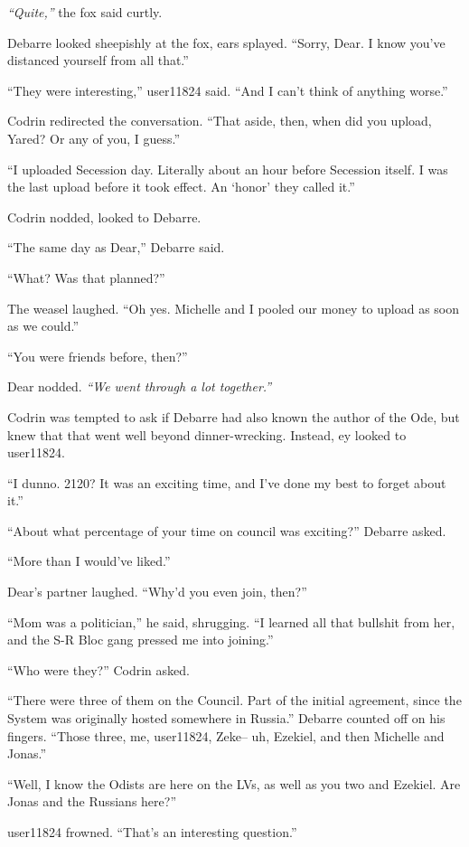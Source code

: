 \emph{``Quite,''} the fox said curtly.

Debarre looked sheepishly at the fox, ears splayed. ``Sorry, Dear. I know you've distanced yourself from all that.''

``They were interesting,'' user11824 said. ``And I can't think of anything worse.''

Codrin redirected the conversation. ``That aside, then, when did you upload, Yared? Or any of you, I guess.''

``I uploaded Secession day. Literally about an hour before Secession itself. I was the last upload before it took effect. An `honor' they called it.''

Codrin nodded, looked to Debarre.

``The same day as Dear,'' Debarre said.

``What? Was that planned?''

The weasel laughed. ``Oh yes. Michelle and I pooled our money to upload as soon as we could.''

``You were friends before, then?''

Dear nodded. \emph{``We went through a lot together.''}

Codrin was tempted to ask if Debarre had also known the author of the Ode, but knew that that went well beyond dinner-wrecking. Instead, ey looked to user11824.

``I dunno. 2120? It was an exciting time, and I've done my best to forget about it.''

``About what percentage of your time on council was exciting?'' Debarre asked.

``More than I would've liked.''

Dear's partner laughed. ``Why'd you even join, then?''

``Mom was a politician,'' he said, shrugging. ``I learned all that bullshit from her, and the S-R Bloc gang pressed me into joining.''

``Who were they?'' Codrin asked.

``There were three of them on the Council. Part of the initial agreement, since the System was originally hosted somewhere in Russia.'' Debarre counted off on his fingers. ``Those three, me, user11824, Zeke-- uh, Ezekiel, and then Michelle and Jonas.''

``Well, I know the Odists are here on the LVs, as well as you two and Ezekiel. Are Jonas and the Russians here?''

user11824 frowned. ``That's an interesting question.''

